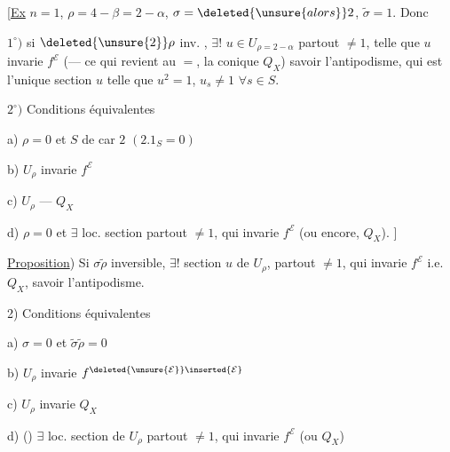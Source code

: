 [\uline{Ex} $n=1$, $\rho=4-\beta=2-\alpha$, $\sigma=\deleted{\unsure{alors}}2$,
$\widetilde\sigma=1$. Donc

 $1^\circ)$ si $\deleted{\unsure{2}}\rho$ inv.
,
 $\exists!$ $u\in U_{\rho=2-\alpha}$ partout $\ne1$,
telle que $u$ invarie $f^{\mathcal E}$ (--- ce qui revient au $=$,
 la conique $Q_X$)
savoir l'antipodisme, qui est l'unique section $u$ telle que
$u^2=1$, $u_s\ne1$ $\forall s\in S$.

$2^\circ)$ Conditions équivalentes

a) $\rho=0$ et  $S$ de car $2$ $(2.1_S=0)$

b) $U_\rho$ invarie $f^{\mathcal E}$

c) $U_\rho$ --- $Q_X$

d) $\rho=0$ et $\exists$ loc. section partout $\ne1$,
qui invarie $f^{\mathcal E}$ (ou encore, $Q_X$). ]


\uline{Proposition}) Si $\sigma\widetilde\rho$ inversible,
$\exists!$ section $u$ de $U_\rho$, partout $\ne1$, qui invarie $f^{\mathcal E}$
i.e. $Q_X$, savoir l'antipodisme.

2) Conditions équivalentes

a) $\sigma=0$ et $\widetilde\sigma\widetilde\rho=0$

b) $U_\rho$ invarie $f^{\deleted{\unsure{\mathcal E}}\inserted{\mathcal E}}$

c) $U_\rho$ invarie $Q_X$

d) ()
$\exists$ loc. section de $U_\rho$ partout $\ne1$, qui invarie $f^{\mathcal E}$
(ou $Q_X$)

